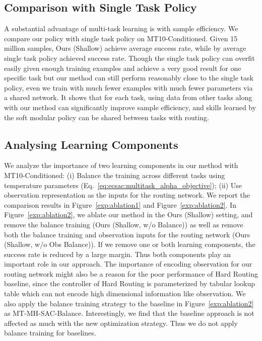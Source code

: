 \documentclass{article}
\begin{document}
\vspace{-0.07in}
\subsection{Comparison with Single Task Policy}
\vspace{-0.07in}


A substantial advantage of multi-task learning is with sample efficiency. We compare our policy with single task policy on MT10-Conditioned. Given 15 million samples, Ours (Shallow) achieve  average success rate, while by average single task policy achieved  success rate.
Though the single task policy can overfit easily given enough training examples and achieve a very good result for one specific task but our method can still perform reasonably close to the single task policy, even we train with much fewer examples with much fewer parameters via a shared network. It shows that for each task, using data from other tasks along with our method can significantly improve sample efficiency, and skills learned by the soft modular policy can be shared between tasks with routing.

\vspace{-0.07in}
\subsection{Analysing Learning Components}
\vspace{-0.07in}
We analyze the importance of two learning components in our method with MT10-Conditioned: (i) Balance the training across different tasks using temperature parameters (Eq.~\ref{eq:ecsac:multitask_alpha_objective}); (ii) Use observation representation as the inputs for the routing network. 
We report the comparison results in Figure~\ref{exp:ablation1} and Figure~\ref{exp:ablation2}. In Figure~\ref{exp:ablation2}, we ablate our method in the Ours (Shallow) setting, and remove the balance training (Ours (Shallow, w/o Balance)) as well as remove both the balance training and observation inputs for the routing network (Ours (Shallow, w/o Obs  Balance)).
If we remove one or both learning components, the success rate is reduced by a large margin. Thus both components play an important role in our approach.
The importance of encoding observation for our routing network might also be a reason for the poor performance of Hard Routing baseline, since the controller of Hard Routing is parameterized by tabular lookup table which can not encode high dimensional information like observation.
We also apply the balance training strategy to the baseline
in Figure~\ref{exp:ablation2} as MT-MH-SAC-Balance. Interestingly, we find that the baseline approach is not affected as much with the new optimization strategy. Thus we do not apply balance training for baselines. 
 
\end{document}
